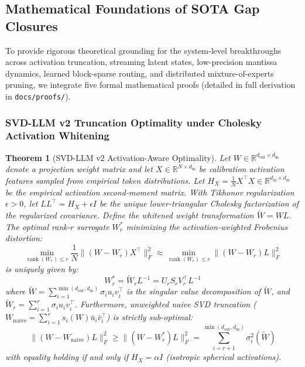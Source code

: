 \documentclass{article}
\newtheorem{theorem}{Theorem}
\begin{document}
\subsection{Mathematical Foundations of SOTA Gap Closures}
\label{sec:sota_gap_proofs}
To provide rigorous theoretical grounding for the system-level breakthroughs across activation truncation, streaming latent states, low-precision mantissa dynamics, learned block-sparse routing, and distributed mixture-of-experts pruning, we integrate five formal mathematical proofs (detailed in full derivation in \texttt{docs/proofs/}).

\subsubsection{SVD-LLM v2 Truncation Optimality under Cholesky Activation Whitening}
\begin{theorem}[SVD-LLM v2 Activation-Aware Optimality]
\label{thm:svd_llm_v2_proof}
Let $W \in \mathbb{R}^{d_{\text{out}} \times d_{\text{in}}}$ denote a projection weight matrix and let $X \in \mathbb{R}^{N \times d_{\text{in}}}$ be calibration activation features sampled from empirical token distributions. Let $H_X = \frac{1}{N} X^\top X \in \mathbb{R}^{d_{\text{in}} \times d_{\text{in}}}$ be the empirical activation second-moment matrix. With Tikhonov regularization $\epsilon > 0$, let $L L^\top = H_X + \epsilon I$ be the unique lower-triangular Cholesky factorization of the regularized covariance. 
Define the whitened weight transformation $\widetilde{W} = W L$. The optimal rank-$r$ surrogate $W_r^*$ minimizing the activation-weighted Frobenius distortion:
\begin{equation}
    \min_{\operatorname{rank}(W_r) \le r} \frac{1}{N} \|(W - W_r) X^\top\|_F^2 \approx \min_{\operatorname{rank}(W_r) \le r} \|(W - W_r) L\|_F^2
\end{equation}
is uniquely given by:
\begin{equation}
    W_r^* = \widetilde{W}_r L^{-1} = U_r S_r V_r^\top L^{-1}
\end{equation}
where $\widetilde{W} = \sum_{i=1}^{\min(d_{\text{out}}, d_{\text{in}})} \sigma_i u_i v_i^\top$ is the singular value decomposition of $\widetilde{W}$, and $\widetilde{W}_r = \sum_{i=1}^r \sigma_i u_i v_i^\top$.
Furthermore, unweighted naive SVD truncation ($W_{\text{naive}} = \sum_{i=1}^r s_i(W) \bar{u}_i \bar{v}_i^\top$) is strictly sub-optimal:
\begin{equation}
    \|(W - W_{\text{naive}}) L\|_F^2 \ge \|(W - W_r^*) L\|_F^2 = \sum_{i=r+1}^{\min(d_{\text{out}}, d_{\text{in}})} \sigma_i^2(\widetilde{W})
\end{equation}
with equality holding if and only if $H_X = \alpha I$ (isotropic spherical activations).
\end{theorem}
\end{document}
